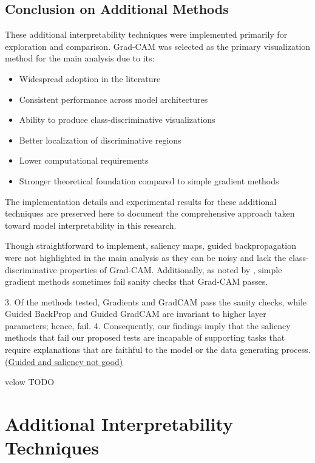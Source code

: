 \documentclass[a4paper,12pt]{report}
\begin{document}
\subsection{Conclusion on Additional Methods}

These additional interpretability techniques were implemented primarily for exploration and comparison. Grad-CAM was selected as the primary visualization method for the main analysis due to its:

\begin{itemize}
    \item Widespread adoption in the literature
    \item Consistent performance across model architectures
    \item Ability to produce class-discriminative visualizations
    \item Better localization of discriminative regions
    \item Lower computational requirements
    \item Stronger theoretical foundation compared to simple gradient methods
\end{itemize}

The implementation details and experimental results for these additional techniques are preserved here to document the comprehensive approach taken toward model interpretability in this research.

Though straightforward to implement, saliency maps,  guided backpropagation were not highlighted in the main analysis as they can be noisy and lack the class-discriminative properties of Grad-CAM. Additionally, as noted by \cite{Adebayo2018}, simple gradient methods sometimes fail sanity checks that Grad-CAM passes.

3. Of the methods tested, Gradients and GradCAM pass the sanity checks, while Guided BackProp and
Guided GradCAM are invariant to higher layer parameters; hence, fail.
4. Consequently, our findings imply that the saliency methods that fail our proposed tests are incapable
of supporting tasks that require explanations that are faithful to the model or the data generating
process.  \href{https://arxiv.org/pdf/1810.03292}{(Guided and saliency not good)}

velow TODO
\section{Additional Interpretability Techniques}
\label{appendix:add_interpret}
\end{document}
